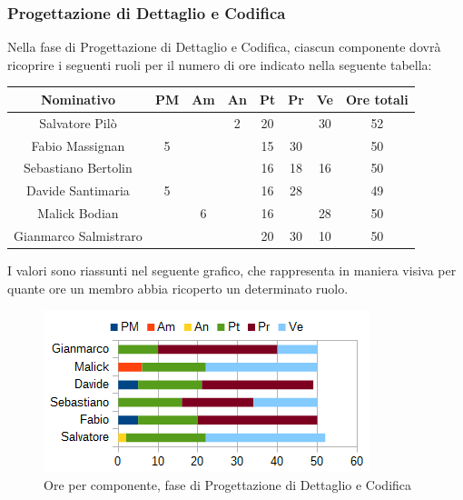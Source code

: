 		\subsubsection{Progettazione di Dettaglio e Codifica}
		Nella fase di Progettazione di Dettaglio e Codifica, ciascun componente dovrà ricoprire i seguenti ruoli per il numero di ore indicato nella seguente tabella: \\
		\begin{table}[H]
		\centering
		\begin{tabular}{|c|c|c|c|c|c|c|c|}
			\hline
			\textbf{Nominativo}		& \textbf{PM}	& \textbf{Am}	& \textbf{An}	& \textbf{Pt}	& \textbf{Pr}	& \textbf{Ve}	& \textbf{Ore totali}     \\
			\hline
			Salvatore Pilò			& 		& 		& 2		& 20	&		& 30	& 52 \\
			Fabio Massignan			& 5		& 		&		& 15	& 30	& 		& 50 \\
			Sebastiano Bertolin		&		& 		& 		& 16	& 18	& 16	& 50 \\
			Davide Santimaria		& 5		& 		& 		& 16	& 28	&		& 49 \\
			Malick Bodian			& 		& 6		&		& 16	&		& 28	& 50 \\
			Gianmarco Salmistraro	&		& 		& 		& 20	& 30	& 10	& 50 \\
			\hline
		\end{tabular}
		\end{table}
		I valori sono riassunti nel seguente grafico, che rappresenta in maniera visiva per quante ore un membro abbia ricoperto un determinato ruolo. \\
		\begin{figure}[H]
			\centering
			\includegraphics[width=1\linewidth]{immagini/grafici/progettazione_dettaglio_codifica-barra.png}
			\caption{Ore per componente, fase di Progettazione di Dettaglio e Codifica}
		\end{figure}
